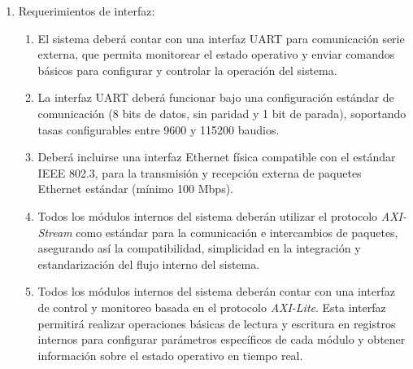 \documentclass[
11pt, %
]{charter}
\begin{document}
\begin {enumerate}
\begin{enumerate}
			\item Los bloques Modulador y Demodulador se verificarán en conjunto conectando los mismos en \textit{loopback} en un banco de pruebas realizado para dicho propósito.		
			\item Todos las simulaciones funcionales deben realizar con herramientas reconocidas como Vivado Simulator, ModelSim o herramientas equivalentes.		
			\item La verificación del sistema deberá incluir simulaciones de integración, donde se validará la interoperabilidad de los módulos interconectados mediante interfaces AXI-Stream y AXI-Lite.		
			\item La validación del sistema deberá realizarse haciendo pruebas funcionales en la placa de desarrollo en modo \textit{loopback} lógico, verificando el cumplimiento de los requisitos del estándar CCSDS y la correcta operación del flujo completo desde generación hasta recepción de datos.			
			\item Se debe incluir una simulación con la inserción controlada de errores (por ejemplo, ruido o corrupción artificial de paquetes) para verificar la robustez y la capacidad de corrección de errores del sistema implementado.						
		\end{enumerate}
				
	\item Requerimientos de interfaz:
		\begin{enumerate}
			\item El sistema deberá contar con una interfaz UART para comunicación serie externa, que permita monitorear el estado operativo y enviar comandos básicos para configurar y controlar la operación del sistema.
			\item La interfaz UART deberá funcionar bajo una configuración estándar de comunicación (8 bits de datos, sin paridad y 1 bit de parada), soportando tasas configurables entre 9600 y 115200 baudios.
			\item Deberá incluirse una interfaz Ethernet física compatible con el estándar IEEE 802.3, para la transmisión y recepción externa de paquetes Ethernet estándar (mínimo 100 Mbps).
			\item Todos los módulos internos del sistema deberán utilizar el protocolo \textit{AXI-Stream} como estándar para la comunicación e intercambios de paquetes, asegurando así la compatibilidad, simplicidad en la integración y estandarización del flujo interno del sistema.
			\item Todos los módulos internos del sistema deberán contar con una interfaz de control y monitoreo basada en el protocolo \textit{AXI-Lite}. Esta interfaz permitirá realizar operaciones básicas de lectura y escritura en registros internos para configurar parámetros específicos de cada módulo y obtener información sobre el estado operativo en tiempo real.
		\end{enumerate}
\end{enumerate}
\end{document}
